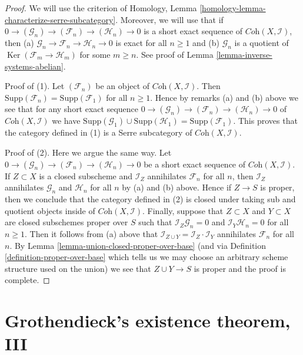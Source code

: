 \documentclass{stacks-project}
\theoremstyle{plain}
\theoremstyle{definition}
\theoremstyle{remark}
\numberwithin{equation}{subsection}
\def\Ker{\mathop{\mathrm{Ker}}}
\begin{document}
\begin{proof}
We will use the criterion of
Homology, Lemma \ref{homology-lemma-characterize-serre-subcategory}.
Moreover, we will use that if
$0 \to (\mathcal{G}_n) \to (\mathcal{F}_n) \to (\mathcal{H}_n) \to 0$
is a short exact sequence of $\textit{Coh}(X, \mathcal{I})$, then
(a) $\mathcal{G}_n \to \mathcal{F}_n \to \mathcal{H}_n \to 0$
is exact for all $n \geq 1$ and
(b) $\mathcal{G}_n$ is a quotient of $\Ker(\mathcal{F}_m \to \mathcal{H}_m)$
for some $m \geq n$. See proof of Lemma \ref{lemma-inverse-systems-abelian}.

\medskip\noindent
Proof of (1). Let $(\mathcal{F}_n)$ be an object of
$\textit{Coh}(X, \mathcal{I})$. Then
$\text{Supp}(\mathcal{F}_n) = \text{Supp}(\mathcal{F}_1)$ for all $n \geq 1$.
Hence by remarks (a) and (b) above we see that
for any short exact sequence
$0 \to (\mathcal{G}_n) \to (\mathcal{F}_n) \to (\mathcal{H}_n) \to 0$
of $\textit{Coh}(X, \mathcal{I})$ we have
$\text{Supp}(\mathcal{G}_1) \cup \text{Supp}(\mathcal{H}_1) =
\text{Supp}(\mathcal{F}_1)$.
This proves that the category defined in (1)
is a Serre subcategory of $\textit{Coh}(X, \mathcal{I})$.

\medskip\noindent
Proof of (2). Here we argue the same way. Let
$0 \to (\mathcal{G}_n) \to (\mathcal{F}_n) \to (\mathcal{H}_n) \to 0$
be a short exact sequence of $\textit{Coh}(X, \mathcal{I})$.
If $Z \subset X$ is a closed subscheme and $\mathcal{I}_Z$
annihilates $\mathcal{F}_n$ for all $n$, then
$\mathcal{I}_Z$ annihilates $\mathcal{G}_n$ and $\mathcal{H}_n$
for all $n$ by (a) and (b) above.
Hence if $Z \to S$ is proper, then we conclude that the category
defined in (2) is closed under taking sub and quotient objects
inside of $\textit{Coh}(X, \mathcal{I})$.
Finally, suppose that $Z \subset X$ and $Y \subset X$ are
closed subschemes proper over $S$ such that
$\mathcal{I}_Z \mathcal{G}_n = 0$ and
$\mathcal{I}_Y \mathcal{H}_n = 0$ for all $n \geq 1$.
Then it follows from (a) above that
$\mathcal{I}_{Z \cup Y} = \mathcal{I}_Z \cdot \mathcal{I}_Y$
annihilates $\mathcal{F}_n$ for all $n$.
By Lemma \ref{lemma-union-closed-proper-over-base}
(and via Definition \ref{definition-proper-over-base} which
tells us we may choose an arbitrary scheme structure used on the union)
we see that $Z \cup Y \to S$ is proper and the proof is complete.
\end{proof}








\section{Grothendieck's existence theorem, III}
\label{section-existence-proper-support}
\end{document}
